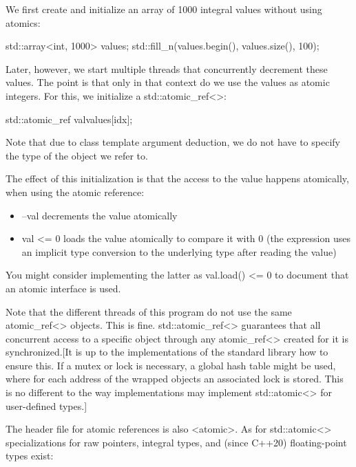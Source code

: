 We first create and initialize an array of 1000 integral values without using atomics:

\begin{cpp}
std::array<int, 1000> values;
std::fill_n(values.begin(), values.size(), 100);
\end{cpp}

Later, however, we start multiple threads that concurrently decrement these values. The point is that only in that context do we use the values as atomic integers. For this, we initialize a std::atomic\_ref<>:

\begin{cpp}
std::atomic_ref val{values[idx]};
\end{cpp}

Note that due to class template argument deduction, we do not have to specify the type of the object we refer to.

The effect of this initialization is that the access to the value happens atomically, when using the atomic reference:

\begin{itemize}
\item 
--val decrements the value atomically

\item 
val <= 0 loads the value atomically to compare it with 0 (the expression uses an implicit type conversion to the underlying type after reading the value)
\end{itemize}

You might consider implementing the latter as val.load() <= 0 to document that an atomic interface is used.

Note that the different threads of this program do not use the same atomic\_ref<> objects. This is fine. std::atomic\_ref<> guarantees that all concurrent access to a specific object through any atomic\_ref<> created for it is synchronized.[It is up to the implementations of the standard library how to ensure this. If a mutex or lock is necessary, a global hash table might be used, where for each address of the wrapped objects an associated lock is stored. This is no different to the way implementations may implement std::atomic<> for user-defined types.]


The header file for atomic references is also <atomic>. As for std::atomic<> specializations for raw pointers, integral types, and (since C++20) floating-point types exist:


